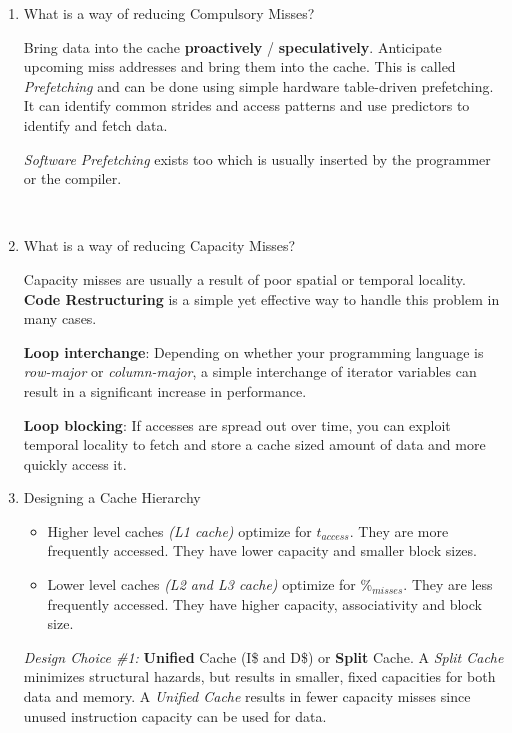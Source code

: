 \documentclass[12pt]{article}
\newenvironment{QandA}{\begin{enumerate}[label=\bfseries\arabic*.]\bfseries}
                      {\end{enumerate}}
\newenvironment{answered}{\par\quad\normalfont}{}
\begin{document}
\begin{QandA}
\

\item What is a way of reducing Compulsory Misses?
\begin{answered}
Bring data into the cache \textbf{proactively} / \textbf{speculatively}. Anticipate upcoming miss addresses and bring them into the cache. This is called \textit{Prefetching} and can be done using simple hardware table-driven prefetching. It can identify common strides and access patterns and use predictors to identify and fetch data. 

\textit{Software Prefetching} exists too which is usually inserted by the programmer or the compiler.
\end{answered}

\ 

\item What is a way of reducing Capacity Misses?
\begin{answered}
Capacity misses are usually a result of poor spatial or temporal locality. \textbf{Code Restructuring} is a simple yet effective way to handle this problem in many cases.

\textbf{Loop interchange}: Depending on whether your programming language is \textit{row-major} or \textit{column-major}, a simple interchange of iterator variables can result in a significant increase in performance.

\textbf{Loop blocking}: If accesses are spread out over time, you can exploit temporal locality to fetch and store a cache sized amount of data and more quickly access it. 
\end{answered}

\item Designing a Cache Hierarchy
\begin{answered}
\vspace{-0.85cm}
\begin{itemize}
    \item Higher level caches \textit{(L1 cache)} optimize for $t_{access}$. They are more frequently accessed. They have lower capacity and smaller block sizes.
    \item Lower level caches \textit{(L2 and L3 cache)} optimize for $\%_{misses}$. They are less frequently accessed. They have higher capacity, associativity and block size.
\end{itemize}

\textit{Design Choice \#1:} \textbf{Unified} Cache (I\$ and D\$) or \textbf{Split} Cache. A \textit{Split Cache} minimizes structural hazards, but results in smaller, fixed capacities for both data and memory. A \textit{Unified Cache} results in fewer capacity misses since unused instruction capacity can be used for data. 


\end{answered}
\end{QandA}
\end{document}
